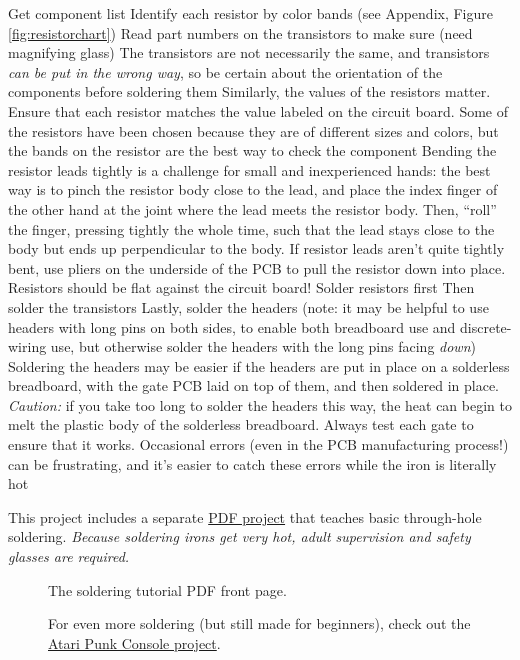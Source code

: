 \+ Get component list 
\+ Identify each resistor by color bands (see Appendix, Figure \ref{fig:resistorchart})
\+ Read part numbers on the transistors to make sure (need magnifying glass)
\+ The transistors are not necessarily the same, and transistors \emph{can be put in the wrong way}, so be certain about the orientation of the components before soldering them
\+ Similarly, the values of the resistors matter. Ensure that each resistor matches the value labeled on the circuit board. Some of the resistors have been chosen because they are of different sizes and colors, but the bands on the resistor are the best way to check the component
\+ Bending the resistor leads tightly is a challenge for small and inexperienced hands: the best way is to pinch the resistor body close to the lead, and place the index finger of the other hand at the joint where the lead meets the resistor body. Then, ``roll'' the finger, pressing tightly the whole time, such that the lead stays close to the body but ends up perpendicular to the body.
\+ If resistor leads aren't quite tightly bent, use pliers on the underside of the PCB to pull the resistor down into place.
\+ Resistors should be flat against the circuit board!
\+ Solder resistors first
\+ Then solder the transistors
\+ Lastly, solder the headers (note: it may be helpful to use headers with long pins on both sides, to enable both breadboard use and discrete-wiring use, but otherwise solder the headers with the long pins facing \emph{down})
\+ Soldering the headers may be easier if the headers are put in place on a solderless breadboard, with the gate PCB laid on top of them, and then soldered in place. \emph{Caution:} if you take too long to solder the headers this way, the heat can begin to melt the plastic body of the solderless breadboard.
\+ Always test each gate to ensure that it works. Occasional errors (even in the PCB manufacturing process!) can be frustrating, and it's easier to catch these errors while the iron is literally hot

\ei

\pagebreak
This project includes a separate {\color{webblue}\href{https://github.com/jessehamner/TechMillForKids/tree/master/soldering}{PDF project}} that teaches basic through-hole soldering. \emph{Because soldering irons get very hot, adult supervision and safety glasses are required.}

\begin{figure}[hb!]
\begin{center}
\end{center}
\caption{The soldering tutorial PDF front page.}
\label{fig:soldering}
\end{figure}

\begin{figure}[hb!]
\begin{center}
\end{center}
\caption{For even more soldering (but still made for beginners), check out the {\color{webblue}\href{https://github.com/jessehamner/AtariPunkConsole}{Atari Punk Console project}}.}
\label{fig:apc}
\end{figure} 

\clearpage